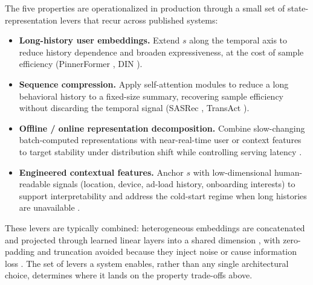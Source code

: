 \documentclass[manuscript,review,screen]{acmart}
\begin{document}
The five properties are operationalized in production through a small set of state-representation levers that recur across published systems:

\begin{itemize}
    \item \textbf{Long-history user embeddings.} Extend $s$ along the temporal axis to reduce history dependence and broaden expressiveness, at the cost of sample efficiency (PinnerFormer \cite{pancha2022pinnerformer}, DIN \cite{Zhou2018}).
    \item \textbf{Sequence compression.} Apply self-attention modules to reduce a long behavioral history to a fixed-size summary, recovering sample efficiency without discarding the temporal signal (SASRec \cite{kang2018sasrec}, TransAct \cite{xia2023transact}).
    \item \textbf{Offline / online representation decomposition.} Combine slow-changing batch-computed representations with near-real-time user or context features to target stability under distribution shift while controlling serving latency \cite{xia2023transact, zhang2024scaling, liu2022monolith}.
    \item \textbf{Engineered contextual features.} Anchor $s$ with low-dimensional human-readable signals (location, device, ad-load history, onboarding interests) to support interpretability and address the cold-start regime when long histories are unavailable \cite{covington2016deep}.
\end{itemize}

These levers are typically combined: heterogeneous embeddings are concatenated and projected through learned linear layers into a shared dimension \cite{pancha2022pinnerformer, grbovic2018real, covington2016deep}, with zero-padding and truncation avoided because they inject noise or cause information loss \cite{xia2023transact}. The set of levers a system enables, rather than any single architectural choice, determines where it lands on the property trade-offs above.
\end{document}
